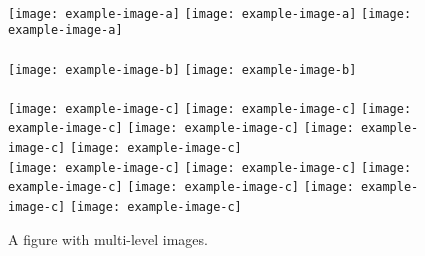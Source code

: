 \begin{figure*}[t] \centering
    \\
    \texttt{[image: example-image-a]}
    \texttt{[image: example-image-a]}
    \texttt{[image: example-image-a]}
    \\
     \hfill
    \\
    \texttt{[image: example-image-b]} \hfill
    \texttt{[image: example-image-b]}
    \\
    \\
    \texttt{[image: example-image-c]}
    \texttt{[image: example-image-c]}
    \texttt{[image: example-image-c]}
    \texttt{[image: example-image-c]}
    \texttt{[image: example-image-c]}
    \texttt{[image: example-image-c]}
    \\
    \texttt{[image: example-image-c]}
    \texttt{[image: example-image-c]}
    \texttt{[image: example-image-c]}
    \texttt{[image: example-image-c]}
    \texttt{[image: example-image-c]}
    \texttt{[image: example-image-c]}
    \\
    \caption{A figure with multi-level images.} 
    \label{fig:fig9}
\end{figure*}

